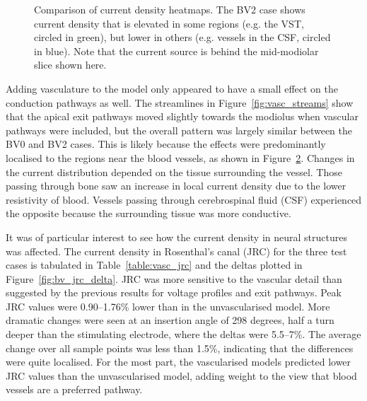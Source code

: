 \begin{figure}[p]
\begin{subfigure}[t]{0.09\textwidth}
        \label{fig:vasc_heat_cbar}
    \end{subfigure}%
    
    \caption[Comparison of current density heatmaps]{Comparison of current
    density heatmaps. The BV2 case shows current density that is elevated in
    some regions (e.g. the VST, circled in green), but lower in others (e.g.
    vessels in the CSF, circled in blue). Note that the current source is
    behind the mid-modiolar slice shown here.}
	\label{fig:vasc_heatmaps}
\end{figure}

Adding vasculature to the model only appeared to have a small effect on the
conduction pathways as well. The streamlines in Figure~\ref{fig:vasc_streams}
show that the apical exit pathways moved slightly towards the modiolus when
vascular pathways were included, but the overall pattern was largely similar
between the BV0 and BV2 cases. This is likely because the effects were
predominantly localised to the regions near the blood vessels, as shown in
Figure~\ref{fig:vasc_heatmaps}. Changes in the current distribution depended on
the tissue surrounding the vessel. Those passing through bone saw an increase in
local current density due to the lower resistivity of blood. Vessels passing
through cerebrospinal fluid (CSF) experienced the opposite because the
surrounding tissue was more conductive.

It was of particular interest to see how the current density in neural
structures was affected. The current density in Rosenthal's canal (JRC) for the
three test cases is tabulated in Table~\ref{table:vasc_jrc} and the deltas
plotted in Figure~\ref{fig:bv_jrc_delta}. JRC was more sensitive to the vascular
detail than suggested by the previous results for voltage profiles and exit
pathways. Peak JRC values were 0.90--1.76\% lower than in the unvascularised
model. More dramatic changes were seen at an insertion angle of 298 degrees,
half a turn deeper than the stimulating electrode, where the deltas were
5.5--7\%. The average change over all sample points was less than 1.5\%,
indicating that the differences were quite localised. For the most part, the
vascularised models predicted lower JRC values than the unvascularised model,
adding weight to the view that blood vessels are a preferred pathway.

